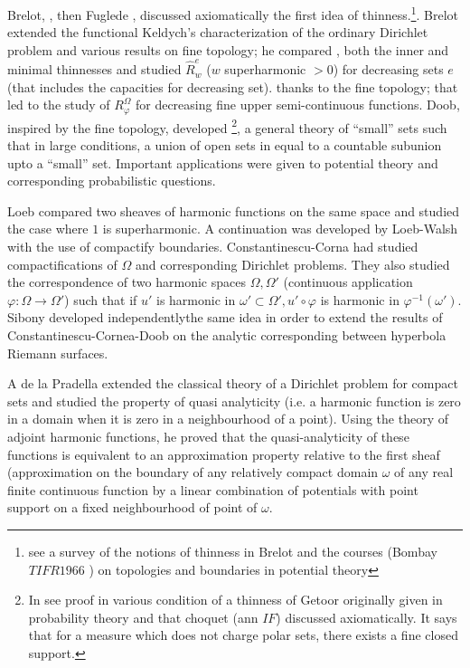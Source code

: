 Brelot\pageoriginale \cite{17}, \cite{13}, then Fuglede \cite{36}, \cite{37}
discussed axiomatically the 
first idea of thinness.\footnote{see a survey of the notions of
  thinness in Brelot \cite{22} and the courses (Bombay $TIFR 1966$ ) on
  topologies and boundaries in potential theory}. Brelot extended
\cite{15} the functional Keldych's characterization of the ordinary
Dirichlet problem and \cite{16} various results on fine topology; he
compared \cite{15}, \cite{16} both the inner and minimal thinnesses and studied
\cite{20} $\hat{R}^e_w$ ($w$ superharmonic $>0$) for decreasing sets $e$
(that includes the capacities for decreasing set). thanks to the fine
topology; that led to the study of $R^\Omega_ \varphi$ for decreasing
fine upper semi-continuous functions. Doob, inspired by the fine
topology, developed \cite{35} \footnote{In \cite{20} \cite{35} see proof in
  various condition of a thinness of Getoor \cite{42} originally given in
  probability theory and that choquet (ann $IF$) discussed
  axiomatically. It says that for a measure which does not charge
  polar sets, there exists a fine closed support.}, a general theory
of ``small'' sets such that in large conditions, a union of open sets
in equal to a countable subunion upto a ``small'' set. Important
applications were given to potential theory and corresponding
probabilistic questions. 

Loeb \cite{52} compared two sheaves of harmonic functions on the same space
and studied the case where $1$ is superharmonic. A continuation was
developed by Loeb-Walsh \cite{55} with the use of compactify
boundaries. Constantinescu-Corna had studied compactifications of
$\Omega$ and corresponding Dirichlet problems. They also studied
\cite{38} the correspondence of two harmonic spaces $\Omega, \Omega'$
(continuous application $\varphi :\Omega \to \Omega'$) such that if
$u'$ is harmonic in $\omega' \subset \Omega', u' \circ \varphi$ is harmonic
in $\varphi^{-1}(\omega')$. Sibony \cite{63} developed independently\pageoriginale the
same idea in order to extend the results of Constantinescu-Cornea-Doob
on the analytic corresponding between hyperbola Riemann surfaces. 

A de la Pradella \cite{51} extended the classical theory of a Dirichlet
problem for compact sets and studied the property of quasi analyticity
(i.e. a harmonic function is zero in a domain when it is zero in a
neighbourhood of a point). Using the theory of adjoint harmonic
functions, he proved that the quasi-analyticity of these functions is
equivalent to an approximation property relative to the first sheaf
(approximation on the boundary of any relatively compact domain
$\omega$ of any real finite continuous function by a linear combination
of potentials with point support on a fixed neighbourhood of point
of $\omega$. 

